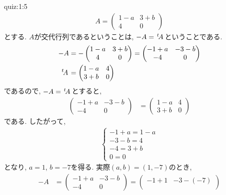 \begin{answerof}{quiz:1:5}
  \begin{align*}
    A=
    \begin{pmatrix}
      1-a& 3+b\\
      4  &0
    \end{pmatrix}
  \end{align*}
  とする.
  $A$が交代行列であるということは, $-A={\left.^{t}\!A\right.}$ということである.
  \begin{align*}
    -A&=
    -\begin{pmatrix}
      1-a& 3+b\\
      4  &0
    \end{pmatrix}
=    \begin{pmatrix}
      -1+a& -3-b\\
      -4  &0
    \end{pmatrix}\\    
    {\left.^{t}\!A\right.}&=
    \begin{pmatrix}
      1-a& 4\\
      3+b &0
    \end{pmatrix}
  \end{align*}
  であるので, $-A={\left.^{t}\!A\right.}$とすると,
  \begin{align*}
    \begin{pmatrix}
      -1+a& -3-b\\
      -4  &0
    \end{pmatrix}&=
    \begin{pmatrix}
      1-a& 4\\
      3+b &0
    \end{pmatrix}
  \end{align*}
  である.
  したがって, 
  \begin{align*}
    \begin{cases}
      -1+a=1-a\\
      -3-b=4\\
      -4=3+b\\
      0=0
    \end{cases}
  \end{align*}
  となり, $a=1$, $b=-7$を得る.
  実際$(a,b)=(1,-7)$のとき,
  \begin{align*}
    -A&=
    \begin{pmatrix}
      -1+a& -3-b\\
      -4  &0
    \end{pmatrix}
    =
    \begin{pmatrix}
      -1+1& -3-(-7)\\

\end{pmatrix}
\end{align*}
\end{answerof}
